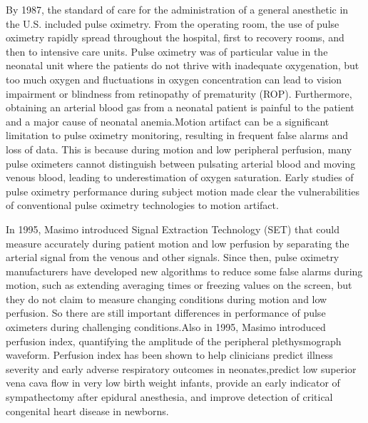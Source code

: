 \documentclass[12pt]{article}
\begin{document}
By 1987, the standard of care for the administration of a general anesthetic in the U.S. included pulse oximetry. From the operating room, the use of pulse oximetry rapidly spread throughout the hospital, first to recovery rooms, and then to intensive care units. Pulse oximetry was of particular value in the neonatal unit where the patients do not thrive with inadequate oxygenation, but too much oxygen and fluctuations in oxygen concentration can lead to vision impairment or blindness from retinopathy of prematurity (ROP). Furthermore, obtaining an arterial blood gas from a neonatal patient is painful to the patient and a major cause of neonatal anemia.Motion artifact can be a significant limitation to pulse oximetry monitoring, resulting in frequent false alarms and loss of data. This is because during motion and low peripheral perfusion, many pulse oximeters cannot distinguish between pulsating arterial blood and moving venous blood, leading to underestimation of oxygen saturation. Early studies of pulse oximetry performance during subject motion made clear the vulnerabilities of conventional pulse oximetry technologies to motion artifact.

In 1995, Masimo introduced Signal Extraction Technology (SET) that could measure accurately during patient motion and low perfusion by separating the arterial signal from the venous and other signals. Since then, pulse oximetry manufacturers have developed new algorithms to reduce some false alarms during motion, such as extending averaging times or freezing values on the screen, but they do not claim to measure changing conditions during motion and low perfusion. So there are still important differences in performance of pulse oximeters during challenging conditions.Also in 1995, Masimo introduced perfusion index, quantifying the amplitude of the peripheral plethysmograph waveform. Perfusion index has been shown to help clinicians predict illness severity and early adverse respiratory outcomes in neonates,predict low superior vena cava flow in very low birth weight infants, provide an early indicator of sympathectomy after epidural anesthesia, and improve detection of critical congenital heart disease in newborns.
\end{document}
